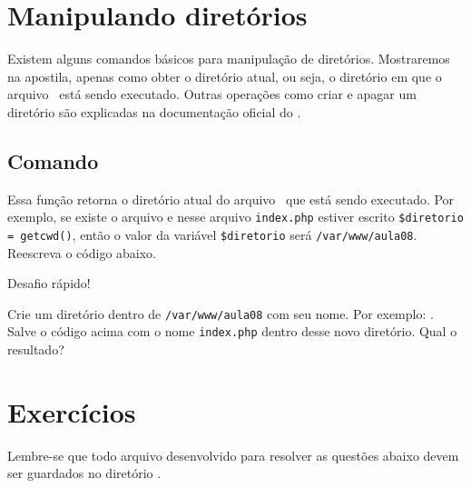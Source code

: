\section{Manipulando diretórios}
\label{manipulando-diretorios}

Existem alguns comandos básicos para manipulação de diretórios. Mostraremos
na apostila, apenas como obter o diretório atual, ou seja, o diretório em que o
arquivo \phpextensao~está sendo executado. Outras operações como criar e apagar
um diretório são explicadas na documentação oficial do \php.

\subsection{Comando \funcaogetcwd}
\label{comando-getcwd}

Essa função retorna o diretório atual do arquivo \php~que está sendo executado.
Por exemplo, se existe o arquivo  e nesse
arquivo \texttt{index.php} estiver escrito \texttt{\$diretorio = getcwd()},
então o valor da variável \texttt{\$diretorio} será \texttt{/var/www/aula08}.
Reescreva o código abaixo.



\begin{framed}
{\Large Desafio rápido!}

Crie um diretório dentro de \texttt{/var/www/aula08} com seu nome. Por exemplo:
. Salve o código acima com o nome \texttt{index.php}
dentro desse novo diretório. Qual o resultado?
\end{framed}

\section{Exercícios}
\label{cap9-exercicios}
Lembre-se que todo arquivo desenvolvido para resolver as questões abaixo devem ser
guardados no diretório .

